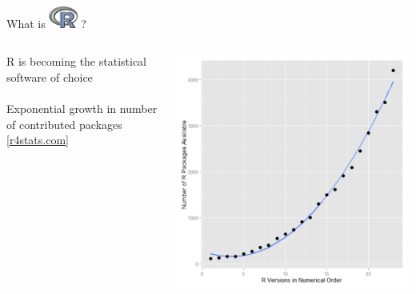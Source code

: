 \documentclass[xcolor=svgnames]{beamer}\usepackage[]{graphicx}\usepackage[]{color}
\begin{document}
\begin{frame}[t]{What is \includegraphics[width=0.07\textwidth]{Rlogo.jpg} \hspace{0.2em}? }
\vspace{-0.1in}
\begin{columns}
\begin{column}{0.4\textwidth}
R is becoming the statistical software of choice\\~\\
Exponential growth in number of contributed packages
[\href{http://r4stats.com/articles/popularity/}{r4stats.com}]
\end{column}
\begin{column}{0.5\textwidth}
\begin{center}
\includegraphics[width=1.1\textwidth]{r_package.png}
\end{center}
\end{column}
\end{columns}
\end{frame}
\end{document}
